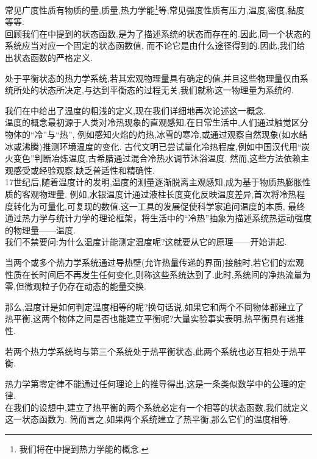\documentclass{ctexart}
\begin{document}
常见广度性质有物质的量,质量,热力学能\footnote{我们将在中提到热力学能的概念.}等;常见强度性质有压力,温度,密度,黏度等等.\\
\indent 回顾我们在中提到的状态函数,是为了描述系统的状态而存在的.因此,同一个状态的系统应当对应一个固定的状态函数值,%
而不论它是由什么途径得到的.因此,我们给出状态函数的严格定义.
\begin{definition}[2A.1.6 状态函数]
    处于平衡状态的热力学系统,若其宏观物理量具有确定的值,并且这些物理量仅由系统所处的状态所决定,与达到平衡态的过程无关,我们就称这一物理量为系统的.
\end{definition}\vspace{8pt}
\indent 我们在中给出了温度的粗浅的定义,现在我们详细地再次论述这一概念.\\
\indent 温度的概念最初源于人类对冷热现象的直观感知.在日常生活中,人们通过触觉区分物体的“冷”与“热”,%
例如感知火焰的灼热,冰雪的寒冷,或通过观察自然现象(如水结冰或沸腾)推测环境温度的变化.%
古代文明已尝试量化冷热程度,例如中国汉代用“炭火变色”判断冶炼温度,古希腊通过混合冷热水调节沐浴温度.%
然而,这些方法依赖主观感受或经验观察,缺乏普适性和精确性.\\
\indent 17世纪后,随着温度计的发明,温度的测量逐渐脱离主观感知,成为基于物质热膨胀性质的客观物理量.%
例如,水银温度计通过液柱长度变化反映温度差异,首次将冷热程度转化为可量化,可复现的数值.这一工具的发展促使科学家追问温度的本质,%
最终通过热力学与统计力学的理论框架，将生活中的“冷热”抽象为描述系统热运动强度的物理量——温度.\\
\indent 我们不禁要问:为什么温度计能测定温度呢?这就要从它的原理——开始讲起.
\begin{definition}[2A.2.1 热平衡]
    当两个或多个热力学系统通过导热壁(允许热量传递的界面)接触时,若它们的宏观性质在长时间后不再发生任何变化,则称这些系统达到了.此时,系统间的净热流量为零,但微观粒子仍存在动态的能量交换.
\end{definition}
那么,温度计是如何判定温度相等的呢?换句话说,如果它和两个不同物体都建立了热平衡,这两个物体之间是否也能建立平衡呢?大量实验事实表明,热平衡具有递推性.
\begin{theorem}[2A.2.2 热力学第零定律]
    若两个热力学系统均与第三个系统处于热平衡状态,此两个系统也必互相处于热平衡.
\end{theorem}
热力学第零定律不能通过任何理论上的推导得出,这是一条类似数学中的公理的定律.\\
\indent 在我们的设想中,建立了热平衡的两个系统必定有一个相等的状态函数,我们就定义这一状态函数为.%
简而言之,如果两个系统建立了热平衡,那么它们的温度相等.%
\end{document}
